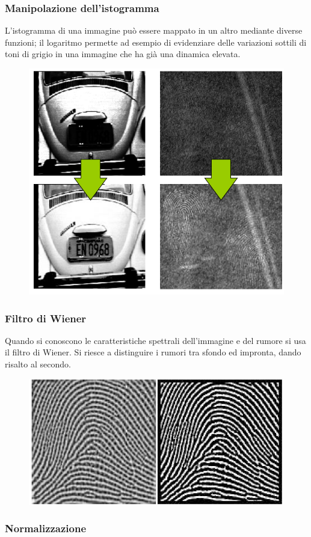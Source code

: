 \subsubsection{Manipolazione dell'istogramma}

L’istogramma di una
immagine può essere
mappato in un altro
mediante diverse
funzioni; il logaritmo permette
ad esempio di
evidenziare delle
variazioni sottili di toni
di grigio in una
immagine che ha già
una dinamica elevata.

\begin{figure}[ht]
    \centering
    \includegraphics[width=0.5\linewidth]{chapters/images-chap6/man-isto.png}
\end{figure}

\subsubsection{Filtro di Wiener}

Quando si conoscono le caratteristiche spettrali
dell’immagine e del rumore si usa il filtro di
Wiener. Si riesce a distinguire i rumori tra sfondo ed impronta, dando risalto al secondo.

\begin{figure}[ht]
    \centering
    \includegraphics[width=0.5\linewidth]{chapters/images-chap6/filtro-we.png}
\end{figure}

\subsubsection{Normalizzazione}

